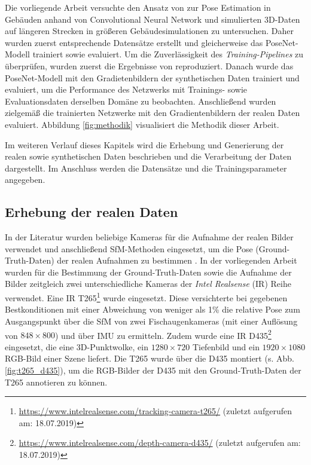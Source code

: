 Die vorliegende Arbeit versuchte den Ansatz von \citet{acharyaBIMPoseNetIndoorCamera2019} zur Pose Estimation in Gebäuden anhand von Convolutional Neural Network und simulierten 3D-Daten auf längeren Strecken in größeren Gebäudesimulationen zu untersuchen. Daher wurden zuerst entsprechende Datensätze erstellt und gleicherweise das PoseNet-Modell trainiert sowie evaluiert. Um die Zuverlässigkeit des \textit{Training-Pipelines} zu überprüfen, wurden zuerst die Ergebnisse von \citet{acharyaBIMPoseNetIndoorCamera2019} reproduziert. Danach wurde das PoseNet-Modell mit den Gradietenbildern der synthetischen Daten trainiert und evaluiert, um die Performance des Netzwerks mit Trainings- sowie Evaluationsdaten derselben Domäne zu beobachten. Anschließend wurden zielgemäß die trainierten Netzwerke mit den Gradientenbildern der realen Daten evaluiert. Abbildung \ref{fig:methodik} visualisiert die Methodik dieser Arbeit.


Im weiteren Verlauf dieses Kapitels wird die Erhebung und Generierung der realen sowie synthetischen Daten beschrieben und die Verarbeitung der Daten dargestellt. Im Anschluss werden die Datensätze und die Trainingsparameter angegeben. 



\subsection{Erhebung der realen Daten}
\label{subsec:record_real_data}
In der Literatur wurden beliebige Kameras für die Aufnahme der realen Bilder verwendet und anschließend SfM-Methoden eingesetzt, um die Pose (Ground-Truth-Daten) der realen Aufnahmen zu bestimmen \cite{kendallPoseNetConvolutionalNetwork2015, clarkVidLocDeepSpatioTemporal2017, acharyaBIMPoseNetIndoorCamera2019}. 
In der vorliegenden Arbeit wurden für die Bestimmung der Ground-Truth-Daten sowie die Aufnahme der Bilder zeitgleich zwei unterschiedliche Kameras der \textit{Intel Realsense} (IR) Reihe verwendet. Eine IR T265\footnote{\url{https://www.intelrealsense.com/tracking-camera-t265/} (zuletzt aufgerufen am: 18.07.2019)} wurde eingesetzt. Diese versichterte bei gegebenen Bestkonditionen mit einer Abweichung von weniger als 1\% die relative Pose zum Ausgangspunkt über die SfM von zwei Fischaugenkameras (mit einer Auflösung von $848 \times 800$) und über IMU zu ermitteln. Zudem wurde eine IR D435\footnote{ \url{https://www.intelrealsense.com/depth-camera-d435/} (zuletzt aufgerufen am: 18.07.2019)} eingesetzt, die eine 3D-Punktwolke, ein $1280\times720$ Tiefenbild und ein $1920\times1080$ RGB-Bild einer Szene liefert. Die T265 wurde über die D435 montiert (s. Abb. \ref{fig:t265_d435}), um die RGB-Bilder der D435 mit den Ground-Truth-Daten der T265 annotieren zu können.

